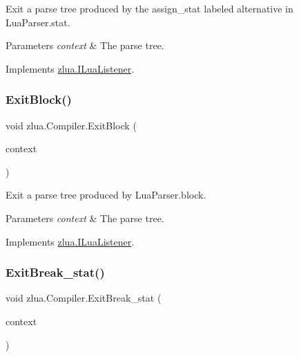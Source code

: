 Exit a parse tree produced by the {\ttfamily assign\+\_\+stat} labeled alternative in Lua\+Parser.\+stat. 


\begin{DoxyParams}{Parameters}
{\em context} & The parse tree.\\
\hline
\end{DoxyParams}


Implements \mbox{\hyperlink{interfacezlua_1_1_i_lua_listener_ad3a0df056fe6b0c23d11cad89f6091c7}{zlua.\+I\+Lua\+Listener}}.

\mbox{\label{classzlua_1_1_compiler_a75376c8d84a2bb594e2fab53270000fb}} 
\subsubsection{\texorpdfstring{Exit\+Block()}{ExitBlock()}}
{\footnotesize\ttfamily void zlua.\+Compiler.\+Exit\+Block (\begin{DoxyParamCaption}\item[{\mbox{[}\+Not\+Null\mbox{]} \mbox{\hyperlink{classzlua_1_1_lua_parser_1_1_block_context}{Lua\+Parser.\+Block\+Context}}}]{context }\end{DoxyParamCaption})}



Exit a parse tree produced by Lua\+Parser.\+block. 


\begin{DoxyParams}{Parameters}
{\em context} & The parse tree.\\
\hline
\end{DoxyParams}


Implements \mbox{\hyperlink{interfacezlua_1_1_i_lua_listener_aa934019f5871ef882e345518906753b7}{zlua.\+I\+Lua\+Listener}}.

\mbox{\label{classzlua_1_1_compiler_a6d60d0ca6f6c6c85d7ed31f0e7e8514d}} 
\subsubsection{\texorpdfstring{Exit\+Break\+\_\+stat()}{ExitBreak\_stat()}}
{\footnotesize\ttfamily void zlua.\+Compiler.\+Exit\+Break\+\_\+stat (\begin{DoxyParamCaption}\item[{\mbox{[}\+Not\+Null\mbox{]} \mbox{\hyperlink{classzlua_1_1_lua_parser_1_1_break__stat_context}{Lua\+Parser.\+Break\+\_\+stat\+Context}}}]{context }\end{DoxyParamCaption})}



